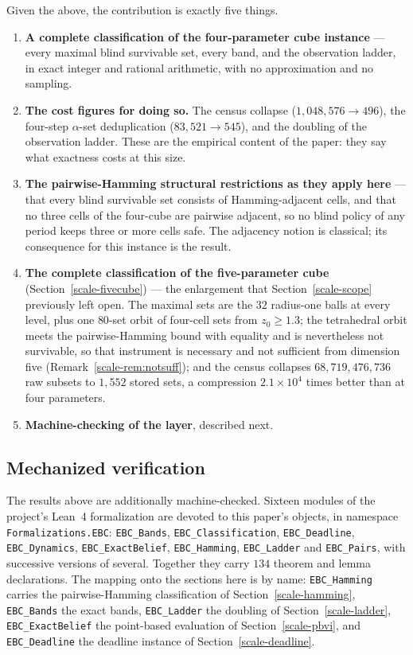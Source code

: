 \documentclass[10pt,twocolumn]{article}
\theoremstyle{plain}
\theoremstyle{definition}
\theoremstyle{remark}
\begin{document}
Given the above, the contribution is exactly five things.

\begin{enumerate}
\item \textbf{A complete classification of the four-parameter cube instance} --- every
  maximal blind survivable set, every band, and the observation ladder, in exact integer
  and rational arithmetic, with no approximation and no sampling.
\item \textbf{The cost figures for doing so.} The census collapse
  (\(1{,}048{,}576 \to 496\)), the four-step \(\alpha\)-set deduplication
  (\(83{,}521 \to 545\)), and the doubling of the observation ladder. These are the
  empirical content of the paper: they say what exactness costs at this size.
\item \textbf{The pairwise-Hamming structural restrictions as they apply here} --- that
  every blind survivable set consists of Hamming-adjacent cells, and that no three cells of
  the four-cube are pairwise adjacent, so no blind policy of any period keeps three or more
  cells safe. The adjacency notion is classical; its consequence for this instance is the
  result.
\item \textbf{The complete classification of the five-parameter cube}
  (Section~\ref{scale-fivecube}) --- the enlargement that Section~\ref{scale-scope} previously left open. The
  maximal sets are the \(32\) radius-one balls at every level, plus one \(80\)-set orbit of
  four-cell sets from \(z_{0} \ge 1.3\); the tetrahedral orbit meets the pairwise-Hamming bound
  with equality and is nevertheless not survivable, so that instrument is necessary and not
  sufficient from dimension five (Remark~\ref{scale-rem:notsuff}); and the census collapses
  \(68{,}719{,}476{,}736\) raw subsets to \(1{,}552\) stored sets, a compression
  \(2.1 \times 10^{4}\) times better than at four parameters.
\item \textbf{Machine-checking of the layer}, described next.
\end{enumerate}

\subsection{Mechanized verification}
\label{scale-mech}

The results above are additionally machine-checked. Sixteen modules of the project's
Lean~4 formalization are devoted to this paper's objects, in namespace
\texttt{Formalizations.EBC}: \texttt{EBC\_Bands}, \texttt{EBC\_Classification},
\texttt{EBC\_Deadline}, \texttt{EBC\_Dynamics}, \texttt{EBC\_ExactBelief},
\texttt{EBC\_Hamming}, \texttt{EBC\_Ladder} and \texttt{EBC\_Pairs}, with successive
versions of several. Together they carry \(134\) theorem and lemma declarations. The
mapping onto the sections here is by name: \texttt{EBC\_Hamming} carries the
pairwise-Hamming classification of Section~\ref{scale-hamming}, \texttt{EBC\_Bands} the exact
bands, \texttt{EBC\_Ladder} the doubling of Section~\ref{scale-ladder},
\texttt{EBC\_ExactBelief} the point-based evaluation of Section~\ref{scale-pbvi}, and
\texttt{EBC\_Deadline} the deadline instance of Section~\ref{scale-deadline}.
\end{document}
